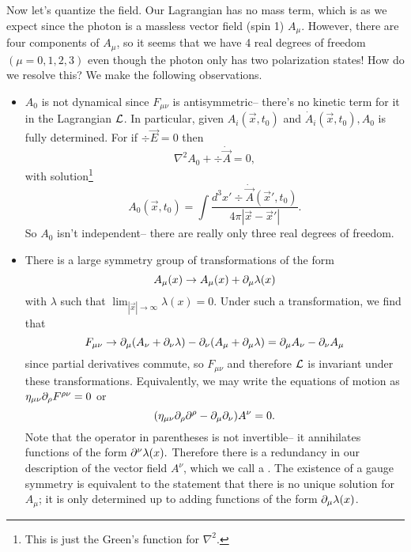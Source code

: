 Now let's quantize the field. Our Lagrangian has no mass term, which is as we expect since the photon is a massless vector field (spin 1) $A_\mu$. However, there are four components of $A_\mu$, so it seems that we have 4 real degrees of freedom $(\mu=0,1,2,3)$ even though the photon only has two polarization states! How do we resolve this? We make the following observations.
\begin{itemize}
    \item $A_0$ is not dynamical since $F_{\mu\nu}$ is antisymmetric-- there's no kinetic term for it in the Lagrangian $\mathcal L$. In particular, given $A_i(\vec x,t_0)$ and $\dot A_i(\vec x,t_0), A_0$ is fully determined. For if $\div \vec E=0$ then
    $$\nabla^2 A_0 +\div \dot{\vec A}=0,$$
    with solution\footnote{This is just the Green's function for $\nabla^2$.}
    \begin{equation}\label{a0solution}
        A_0(\vec x,t_0)=\int \frac{d^3x' \div \dot{\vec A}(\vec x',t_0)}{4\pi|\vec x-\vec x'|}.
    \end{equation}
    So $A_0$ isn't independent-- there are really only three real degrees of freedom.
    \item There is a large symmetry group of transformations of the form
    $$A_\mu(x)\to A_\mu(x)+\partial_\mu \lambda(x)$$
    with $\lambda$ such that $\lim_{|\vec x|\to \infty }\lambda(x)=0$. Under such a transformation, we find that
    $$F_{\mu\nu}\to \partial_\mu(A_\nu+\partial_\nu \lambda)-\partial_\nu(A_\mu+\partial_\mu\lambda)=\partial_\mu A_\nu -\partial_\nu A_\mu$$
    since partial derivatives commute, so $F_{\mu\nu}$ and therefore $\mathcal L$ is invariant under these transformations. Equivalently, we may write the equations of motion as $\eta_{\mu\nu}\partial_\rho F^{\rho\nu}=0$ or
    $$(\eta_{\mu\nu}\partial_\rho \partial^\rho -\partial_\mu \partial_\nu)A^\nu =0.$$
    Note that the operator in parentheses is not invertible-- it annihilates functions of the form $\partial^\nu \lambda(x).$ Therefore there is a redundancy in our description of the vector field $A^\nu$, which we call a . The existence of a gauge symmetry is equivalent to the statement that there is no unique solution for $A_\mu$; it is only determined up to adding functions of the form $\partial_\mu \lambda(x)$.
\end{itemize}

